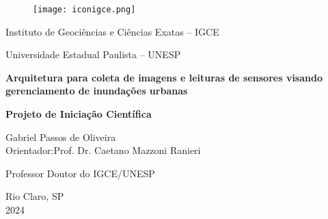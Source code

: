 \documentclass[12pt]{article}
\begin{document}
\thispagestyle{empty}
\begin{figure}[!htb]
\begin{center}
\texttt{[image: iconigce.png]}
\end{center}
\end{figure}

\begin{center}
{{\large  Instituto de Geociências e Ciências Exatas – IGCE}\par} 

{{\large Universidade Estadual Paulista – UNESP}\par}
\end{center}

\vspace{2 cm}
\begin{center}
    { {\Large \bf Arquitetura para coleta de imagens e leituras de sensores visando gerenciamento de inundações urbanas}}
\end{center}


\vspace{2 cm}
\begin{center}
{ {\large \bf Projeto de Iniciação Científica}}

\end{center}

\vspace{1cm}
\begin{center}
\large{Gabriel Passos de Oliveira}\\
\vspace{1.5cm}
\large{Orientador:\hspace{0.18 cm}Prof. Dr. Caetano Mazzoni Ranieri}

\large{Professor Doutor do IGCE/UNESP} 
\end{center}

\vfill
{\centering Rio Claro, SP \\ 2024 \par}
\end{document}
